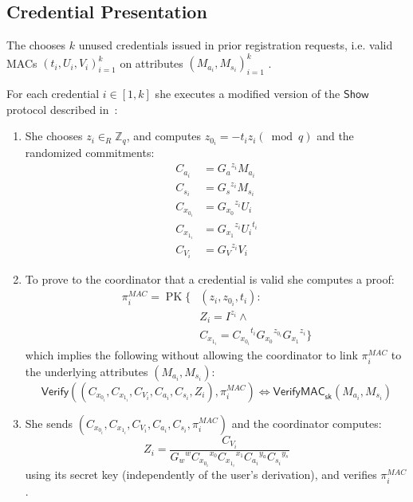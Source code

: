 \documentclass{article}
\begin{document}
\subsection{Credential Presentation}

The chooses $k$ unused credentials issued in prior registration requests, i.e. valid MACs $(t_i,U_i,V_i)_{i=1}^k$ on attributes $(M_{a_i}, M_{s_i})_{i=1}^k$ .

For each credential $i \in [1, k]$ she executes a modified version of the $\mathsf{Show}$ protocol described in~\cite{chase2019signal}:

\begin{enumerate}

\item She chooses
$z_i \in_{R} \mathbb{Z}_{q}$, and computes
$z_{0_i}=-{t_i} {z_i} (\bmod q)$
and the randomized commitments:
\begin{align*}
C_{a_i}     &= {G_a}^{z_i} M_{a_i} \\
C_{s_i}     &= {G_s}^{z_i} M_{s_i} \\
C_{x_{0_i}} &= {G_{x_0}}^{z_i} {U_i} \\
C_{x_{1_i}} &= {G_{x_1}}^{z_i} {U_i}^{t_i} \\
C_{V_i}     &= {G_V}^{z_i} V_i
\end{align*}

\item To prove to the coordinator that a credential is valid she computes a proof:
\begin{align*}
\pi_{i}^{\mathit{MAC}}=\operatorname{PK}\{
& (z_i, z_{0_i},t_i): \\
& Z_i =I^{z_i} \land \\
& C_{x_{1_i}} = {C_{x_{0_i}}}^{t_i} {G_{x_0}}^{z_{0_i}} {G_{x_1}}^{z_i} \}
\end{align*}
which implies the following without allowing the coordinator to link $\pi_{i}^\mathit{MAC}$ to the underlying attributes $(M_{a_i}, M_{s_i})$:
\[
\mathsf{Verify}((C_{x_{0_i}}, C_{x_{1_i}}, C_{V_i}, C_{a_i}, C_{s_i}, Z_i), \pi_i^{\mathit{MAC}})
\iff
\mathsf{VerifyMAC}_{\mathsf{sk}}(M_{a_i}, M_{s_i})
\]

\item She sends $(C_{x_{0_i}}, C_{x_{1_i}}, C_{V_i}, C_{a_i}, C_{s_i}, \pi_i^{\mathit{MAC}})$ and the coordinator computes:
\[
Z_i=\frac{C_{V_i}}{{G_w}^w {C_{x_{0_i}}}^{x_0} {C_{x_{1_i}}}^{x_{1}}
{C_{a_i}}^{y_a} {C_{s_i}}^{y_s}
}
\]
using its secret key (independently of the user's derivation), and verifies $\pi_i^{\mathit{MAC}}$.

\end{enumerate}
\end{document}
